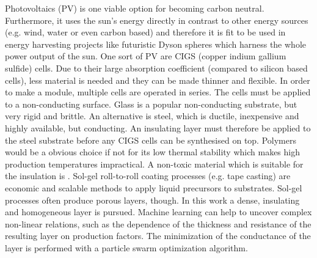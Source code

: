 Photovoltaics (PV) is one viable option for becoming carbon neutral. 
Furthermore, 
it uses the sun's energy directly in contrast to other energy sources (e.g. wind, water or even carbon based) and therefore 
it is fit to be used in energy harvesting projects like futuristic Dyson spheres\cite{dyson1960search} which harness the whole power output of the sun.
%
One sort of PV are CIGS (copper indium gallium sulfide) cells\cite{Vasekar2010}. 
Due to their large absorption coefficient (compared to silicon based cells), less material is needed and they can be made thinner and flexible. 
In order to make a module, multiple cells are operated in series. 
The cells must be applied to a non-conducting surface.
Glass is a popular non-conducting substrate, but very rigid and brittle. 
An alternative is steel, which is ductile, inexpensive and highly available, but conducting. 
An insulating layer must therefore be applied to the steel substrate before any CIGS cells can be synthesised on top.
Polymers would be a obvious choice if not for its low thermal stability which makes high production temperatures impractical.
A non-toxic material which is suitable for the insulation is . 
Sol-gel roll-to-roll coating processes (e.g. tape casting) are economic and scalable methods to apply liquid precursors to substrates.
Sol-gel processes often produce porous layers, though. 
In this work a dense, insulating and homogeneous layer is pursued. 
Machine learning can help to uncover complex non-linear relations, such as the 
dependence of the thickness and resistance of the resulting layer on production factors.
The minimization of the conductance of the layer is performed with a particle swarm optimization 
algorithm. 



